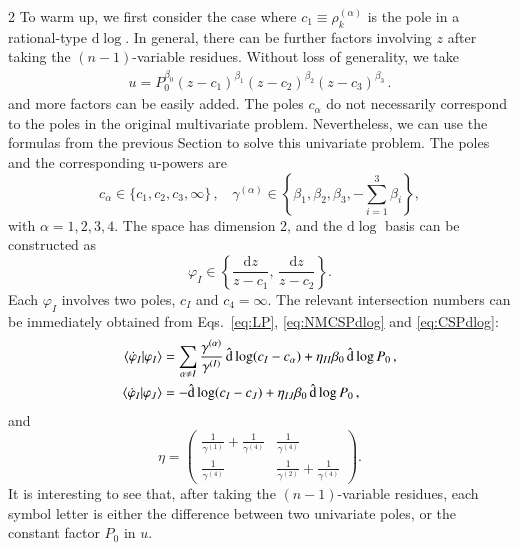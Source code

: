 \documentclass[fleqn]{2023SCGE}
\newcommand{\nn}{\nonumber}
\newcommand{\nd}{\mathrm{d}}
\newcommand{\nds}{\hat{\mathrm{d}}}
\begin{document}
\begin{multicols}{2}
To warm up, we first consider the case where $c_1 \equiv \rho^{(\alpha)}_k$ is the pole in a rational-type $\nd\log$. In general, there can be further factors involving $z$ after taking the $(n-1)$-variable residues. Without loss of generality, we take
\begin{align}
	u=P_0^{\beta_0} (z-c_1)^{\beta_1} (z-c_2)^{\beta_2} (z-c_3)^{\beta_3} \,.
\end{align}
and more factors can be easily added. The poles $c_\alpha$ do not necessarily correspond to the poles in the original multivariate problem. Nevertheless, we can use the formulas from the previous Section to solve this univariate problem. The poles and the corresponding u-powers are
\begin{equation}
    c_\alpha \in \{c_1,c_2,c_3,\infty\} \,, ~~~~
	\gamma^{(\alpha)} \in \left\{ \beta_1,\beta_2,\beta_3,-{ \sum_{i=1}^3} \beta_i \right\} ,
\end{equation}
with $\alpha=1,2,3,4$. The space has dimension 2, and the $\nd \log$ basis can be constructed as
\begin{equation}
\varphi_I \in \left\{ \frac{\nd z}{z-c_1} ,\, \frac{\nd z}{z-c_2} \right\} .
\end{equation}
Each $\varphi_I$ involves two poles, $c_I$ and $c_4=\infty$. The relevant intersection numbers can be immediately obtained from Eqs.~\eqref{eq:LP}, \eqref{eq:NMCSPdlog} and \eqref{eq:CSPdlog}: 
\begin{align}
    \braket{\dot{\varphi}_I|\varphi_I} &= \sum_{\alpha \neq I} \frac{\gamma^{(\alpha)}}{\gamma^{(I)}} \, \nds\log(c_{I}-c_{\alpha}) + \eta_{II} \beta_0 \, \nds\log P_0 \,, \nn
    \\
    \braket{\dot{\varphi}_I|\varphi_J} &= -\nds\log(c_{I}-c_{J}) +\eta_{IJ} \beta_0 \, \nds\log P_0 \,, \label{eq:1formDE}
\end{align}
and
\begin{equation}
    \eta =
    \begin{pmatrix}
        \frac{1}{\gamma^{(1)}}+\frac{1}{\gamma^{(4)}} & \frac{1}{\gamma^{(4)}}
        \\
        \frac{1}{\gamma^{(4)}} & \frac{1}{\gamma^{(2)}}+\frac{1}{\gamma^{(4)}}
    \end{pmatrix}
    .
\end{equation}
It is interesting to see that, after taking the $(n-1)$-variable residues, each symbol letter is either the difference between two univariate poles, or the constant factor $P_0$ in $u$.



\end{multicols}
\end{document}
